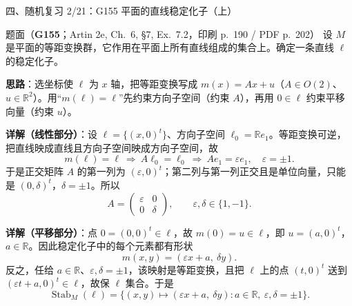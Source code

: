 \documentclass[aspectratio=169,10pt,fontset=none]{ctexbeamer}
\newcommand{\ex}[1]{\textcolor{accent}{\footnotesize\bfseries #1}}
\newcommand{\key}[1]{\textcolor{ink}{\bfseries #1}}
\begin{document}
\begin{frame}[t]{四、随机复习 2/21：G155 平面的直线稳定化子（上）}
\label{ex:G155}
\scriptsize
\begin{block}{\footnotesize 题面（\ex{G155}；Artin 2e, Ch.~6, §7, Ex.~7.2，印刷 p.~190 / PDF p.~202）}
设 $M$ 是平面的等距变换群，它作用在平面上所有直线组成的集合上。确定一条直线 $\ell$ 的稳定化子。
\end{block}
\key{思路}：选坐标使 $\ell$ 为 $x$ 轴，把等距变换写成 $m(x)=Ax+u$（$A\in O(2)$、$u\in\mathbb R^2$）。用“$m(\ell)=\ell$”先约束方向子空间（约束 $A$），再用 $0\in\ell$ 约束平移向量（约束 $u$）。

\key{详解（线性部分）}：设 $\ell=\{(x,0)^t\}$、方向子空间 $\ell_0=\mathbb Re_1$。等距变换可逆，把直线映成直线且方向子空间映成方向子空间，故
\[ m(\ell)=\ell\ \Longrightarrow\ A\ell_0=\ell_0\ \Longrightarrow\ Ae_1=\varepsilon e_1,\quad\varepsilon=\pm1. \]
于是正交矩阵 $A$ 的第一列为 $(\varepsilon,0)^t$；第二列与第一列正交且是单位向量，只能是 $(0,\delta)^t$，$\delta=\pm1$。所以
\[ A=\begin{pmatrix}\varepsilon&0\\0&\delta\end{pmatrix},\qquad \varepsilon,\delta\in\{1,-1\}. \]

\key{详解（平移部分）}：点 $0=(0,0)^t\in\ell$，故 $m(0)=u\in\ell$，即 $u=(a,0)^t$，$a\in\mathbb R$。因此稳定化子中的每个元素都有形状
\[ m(x,y)=(\varepsilon x+a,\ \delta y). \]
反之，任给 $a\in\mathbb R$、$\varepsilon,\delta=\pm1$，该映射是等距变换，且把 $\ell$ 上的点 $(t,0)^t$ 送到 $(\varepsilon t+a,0)^t\in\ell$，故保 $\ell$ 集合。于是
\[ \operatorname{Stab}_M(\ell)=\{(x,y)\mapsto(\varepsilon x+a,\ \delta y):a\in\mathbb R,\ \varepsilon,\delta=\pm1\}. \]
\end{frame}
\end{document}
